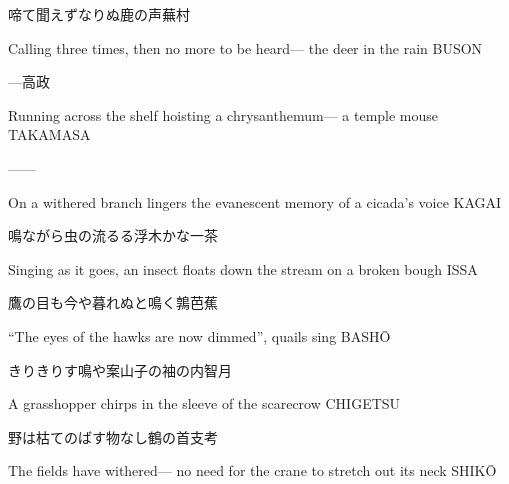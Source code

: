 \begin{haiku}
    {\FH {}啼て聞えずなりぬ鹿の声}\hfill{\FH 蕪村}

    \vin{} Calling three times,
    \vin{} \vin{} then no more to be heard---
    \vin{} \vin{} \vin{} the deer in the rain \hspace{\fill} BUSON
\end{haiku}

\begin{haiku}
    {---}\hfill{\FH 高政}

    \vin{} Running across the shelf
    \vin{} \vin{} hoisting a chrysanthemum---
    \vin{} \vin{} \vin{} a temple mouse \hspace{\fill} TAKAMASA
\end{haiku}

\begin{haiku}
   ---\hfill{---}

    \vin{} On a withered branch
    \vin{} \vin{} lingers the evanescent memory
    \vin{} \vin{} \vin{} of a cicada's voice \hspace{\fill} KAGAI
\end{haiku}

\begin{haiku}
    {\FH 鳴ながら虫の流るる浮木かな}\hfill{\FH 一茶}

    \vin{} Singing as it goes,
    \vin{} \vin{} an insect floats down the stream
    \vin{} \vin{} \vin{} on a broken bough \hspace{\fill} ISSA
\end{haiku}

\begin{haiku}
    {\FH 鷹の目も今や暮れぬと鳴く鶉}\hfill{\FH 芭蕉}

    \vin{} ``The eyes of the hawks
    \vin{} \vin{} are now dimmed'',
    \vin{} \vin{} \vin{} quails sing \hspace{\fill} BASH\={O}
\end{haiku}

\begin{haiku}
    {\FH きりきりす鳴や案山子の袖の内}\hfill{\FH 智月}

    \vin{} A grasshopper
    \vin{} \vin{} chirps in the sleeve
    \vin{} \vin{} \vin{} of the scarecrow \hspace{\fill} CHIGETSU
\end{haiku}

\begin{haiku}
    {\FH 野は枯てのばす物なし鶴の首}\hfill{\FH 支考}

    \vin{} The fields have withered---
    \vin{} \vin{} no need for the crane
    \vin{} \vin{} \vin{} to stretch out its neck \hspace{\fill} SHIK\={O}
\end{haiku}

